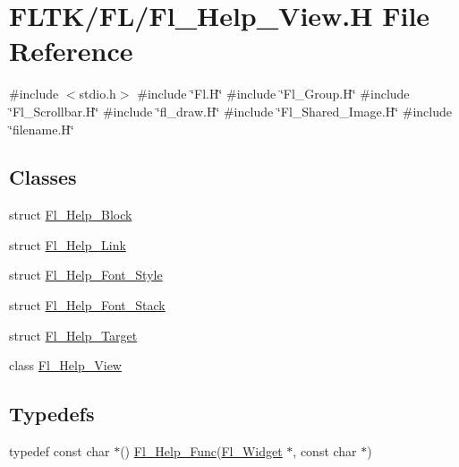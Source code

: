 \hypertarget{_fl___help___view_8_h}{}\section{F\+L\+T\+K/\+F\+L/\+Fl\+\_\+\+Help\+\_\+\+View.H File Reference}
\label{_fl___help___view_8_h}
{\ttfamily \#include $<$stdio.\+h$>$}\newline
{\ttfamily \#include \char`\"{}Fl.\+H\char`\"{}}\newline
{\ttfamily \#include \char`\"{}Fl\+\_\+\+Group.\+H\char`\"{}}\newline
{\ttfamily \#include \char`\"{}Fl\+\_\+\+Scrollbar.\+H\char`\"{}}\newline
{\ttfamily \#include \char`\"{}fl\+\_\+draw.\+H\char`\"{}}\newline
{\ttfamily \#include \char`\"{}Fl\+\_\+\+Shared\+\_\+\+Image.\+H\char`\"{}}\newline
{\ttfamily \#include \char`\"{}filename.\+H\char`\"{}}\newline
\subsection*{Classes}
\begin{DoxyCompactItemize}
\item 
struct \hyperlink{struct_fl___help___block}{Fl\+\_\+\+Help\+\_\+\+Block}
\item 
struct \hyperlink{struct_fl___help___link}{Fl\+\_\+\+Help\+\_\+\+Link}
\item 
struct \hyperlink{struct_fl___help___font___style}{Fl\+\_\+\+Help\+\_\+\+Font\+\_\+\+Style}
\item 
struct \hyperlink{struct_fl___help___font___stack}{Fl\+\_\+\+Help\+\_\+\+Font\+\_\+\+Stack}
\item 
struct \hyperlink{struct_fl___help___target}{Fl\+\_\+\+Help\+\_\+\+Target}
\item 
class \hyperlink{class_fl___help___view}{Fl\+\_\+\+Help\+\_\+\+View}
\end{DoxyCompactItemize}
\subsection*{Typedefs}
\begin{DoxyCompactItemize}
\item 
typedef const char $\ast$() \hyperlink{_fl___help___view_8_h_aa0b16c91e8fd6aee89279c82c09cee9b}{Fl\+\_\+\+Help\+\_\+\+Func}(\hyperlink{class_fl___widget}{Fl\+\_\+\+Widget} $\ast$, const char $\ast$)
\end{DoxyCompactItemize}
